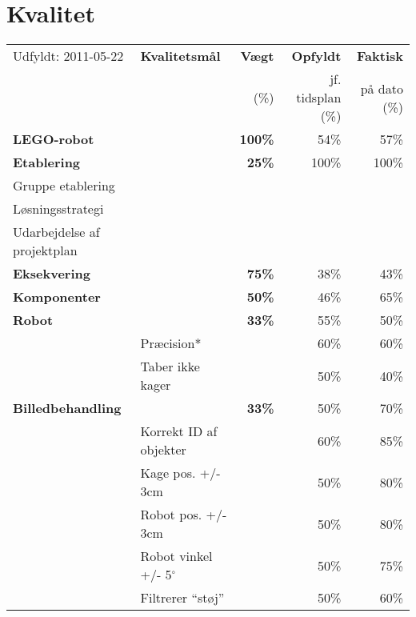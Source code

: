\section{Kvalitet}
\begin{footnotesize}
\begin{center}
\begin{tabular}{l | l | r r r}
	\footnotesize{Udfyldt: 2011-05-22}	& \textbf{Kvalitetsmål} & \textbf{Vægt} & \textbf{Opfyldt} & \textbf{Faktisk}\\
	& & \footnotesize{(\%)}	& \footnotesize{jf. tidsplan (\%)}	& \footnotesize{på dato (\%)} \\
	\hline
	\textbf{LEGO-robot}
																&		& \textbf{100\%} & 54\% & 57\% \\
	\hline
	\hline
	\textbf{Etablering}
																&		& \textbf{25\%} 	& 	100\%	& 100\% \\
	\hspace*{0.3cm} Gruppe etablering
					 											&		&		&		& \\
	\hspace*{0.3cm} Løsningsstrategi
					 											&		&		&		& \\
	\hspace*{0.3cm} Udarbejdelse af projektplan 
																&		&		&		& \\
	\hline
	\textbf{Eksekvering}
																&		& \textbf{75\%}	& 38\% & 43\% \\		
	\hspace*{0.3cm}\textbf{Komponenter}
																&		& \textbf{50\%}		& 	46\% & 65\%\\
	\hspace*{0.3cm}\hspace*{0.3cm} \textbf{Robot}
																& 		& \textbf{33\%} 	& 	55\% & 50\% \\
	& Præcision* & & 60\% & 60\% \\
	& Taber ikke kager & & 50\% & 40\% \\
	\hspace*{0.3cm}\hspace*{0.3cm} \textbf{Billedbehandling}
																& & \textbf{33\%}		&	50\% & 	70\% \\
	& Korrekt ID af objekter & & 60\% & 85\% \\
	& Kage pos. +/- 3cm & & 50\% & 80\% \\
	& Robot pos. +/- 3cm & & 50\% & 80\% \\
	& Robot vinkel +/- 5$^\circ$ & & 50\% & 75\% \\
	& Filtrerer "`støj"' & & 50\% & 60\% \\

\end{tabular}
\end{center}
\end{footnotesize}
